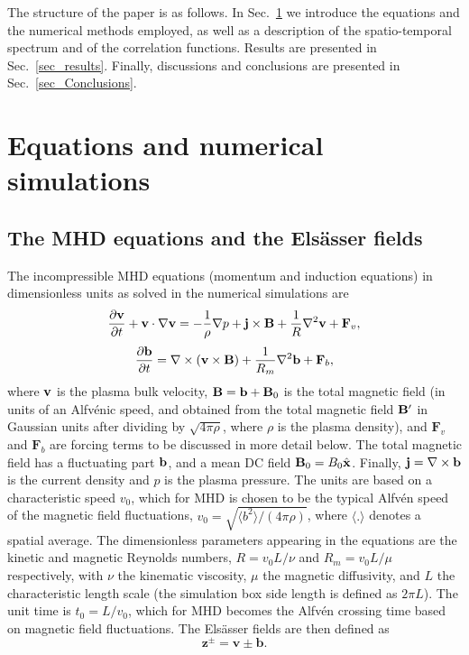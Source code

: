 \documentclass[aip,pop,reprint,amsmath,amssymb,floatfix]{revtex4-1}
\let\oldhat\hat
\renewcommand{\vec}[1]{\mathbf{#1}}
\renewcommand{\hat}[1]{\oldhat{\mathbf{#1}}}
\begin{document}
The structure of the paper is as follows. In Sec.~\ref{sec_EqNumSim}
we introduce the equations and the numerical methods employed, as well
as a description of the spatio-temporal spectrum and of the
correlation functions. Results are presented in
Sec.~\ref{sec_results}. Finally, discussions and conclusions are
presented in Sec.~\ref{sec_Conclusions}.

\section{Equations and numerical simulations}\label{sec_EqNumSim}

\subsection{The MHD equations and the Els\"asser fields}\label{sec_eq}
The incompressible MHD equations (momentum and induction equations) in
dimensionless units as solved in the numerical simulations are
\begin{equation}\label{eq:MHD_v}
  \frac {\partial {\bf v}}{\partial t} +
  {\bf v }\cdot \nabla {\bf v} = -\frac{1}{\rho}\nabla p +
  {\bf j} \times {\bf B} + \frac{1}{R} \nabla^2{\bf v} + \vec{F}_v,
\end{equation}
\begin{equation}\label{eq:MHD_b}
  \frac{\partial {\bf b}}{\partial t} = \nabla \times ({\bf v} 
  \times {\bf B}) + \frac{1}{R_m} \nabla^2 {\bf b} + \vec{F}_b,
\end{equation}
where ${\bf v}$ is the plasma bulk velocity, ${\bf B} = {\bf b} + {\bf
  B}_0$ is the total magnetic field (in units of an Alfv\'enic speed,
and obtained from the total magnetic field ${\bf B}'$ in Gaussian
units after dividing by $\sqrt{4\pi\rho}$, where $\rho$ is the plasma
density), and $\vec{F}_v$ and $\vec{F}_b$ are forcing terms to be
discussed in more detail below. The total magnetic field has a
fluctuating part ${\bf b}$, and a mean DC field ${\bf
  B}_0=B_0\hat{x}$. Finally, ${\bf j} = \nabla \times {\bf b}$ is the
current density and $p$ is the plasma pressure. The units are based on
a characteristic speed $v_0$, which for MHD is chosen to be the
typical Alfv\'en speed of the magnetic field fluctuations, $v_0 =
\sqrt{\langle b^2 \rangle /(4\pi\rho)}$, where $\langle . \rangle$
denotes a spatial average. The dimensionless parameters appearing in
the equations are the kinetic and magnetic Reynolds numbers, $R=v_0
L/\nu$ and $R_m = v_0 L /\mu$ respectively, with $\nu$ the kinematic
viscosity, $\mu$ the magnetic diffusivity, and $L$ the characteristic
length scale (the simulation box side length is defined as $2\pi
L$). The unit time is $t_0 = L/v_0$, which for MHD becomes the
Alfv\'en crossing time based on magnetic field fluctuations. The
Els\"asser fields are then defined as
\begin{equation}\label{eq:MHD_zdef}
\vec{z}^\pm = \vec{v} \pm \vec{b} .
\end{equation}
\end{document}
